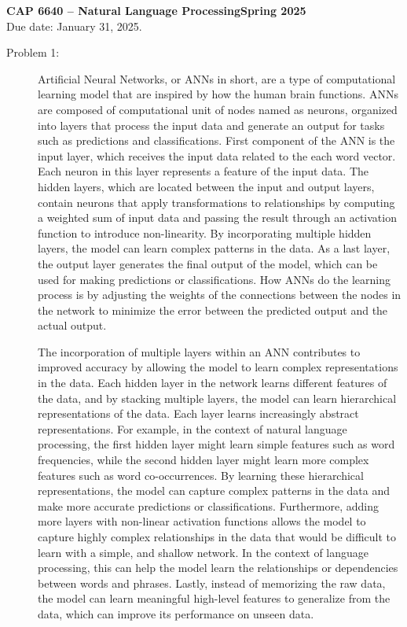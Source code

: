 \documentclass[12pt]{article}
\begin{document}
\noindent \textbf{CAP 6640 -- Natural Language Processing\hspace*{\fill}Spring 2025}\\
 \hfill Due date: January 31, 2025.



\begin{description}
  \item[Problem 1:] %
  
  Artificial Neural Networks, or ANNs in short, are a type of computational learning model that are inspired by how the human brain functions. 
  ANNs are composed of computational unit of nodes named as neurons, organized into layers that process the input data and generate an output for tasks such as predictions and classifications.
  First component of the ANN is the input layer, which receives the input data related to the each word vector. Each neuron in this layer represents a feature of the input data.
  The hidden layers, which are located between the input and output layers, contain neurons that apply transformations to relationships by computing a weighted sum of input data 
  and passing the result through an activation function to introduce non-linearity. By incorporating multiple hidden layers, the model can learn complex patterns in the data.
  As a last layer, the output layer generates the final output of the model, which can be used for making predictions or classifications.
  How ANNs do the learning process is by adjusting the weights of the connections between the nodes in the network to minimize the error between the predicted output and the actual output.

  The incorporation of multiple layers within an ANN contributes to improved accuracy by allowing the model to learn complex representations in the data.
  Each hidden layer in the network learns different features of the data, and by stacking multiple layers, the model can learn hierarchical representations of the data.
  Each layer learns increasingly abstract representations. For example, in the context of natural language processing, the first hidden layer might learn simple features such as
  word frequencies, while the second hidden layer might learn more complex features such as word co-occurrences. By learning these hierarchical representations, the model can capture
  complex patterns in the data and make more accurate predictions or classifications.
  Furthermore, adding more layers with non-linear activation functions allows the model to capture highly complex relationships in the data that would be difficult to learn 
  with a simple, and shallow network. In the context of language processing, this can help the model learn the relationships or dependencies between words and phrases.
  Lastly, instead of memorizing the raw data, the model can learn meaningful high-level features to generalize from the data, which can improve its performance on unseen data.
  

\end{description}
\end{document}
